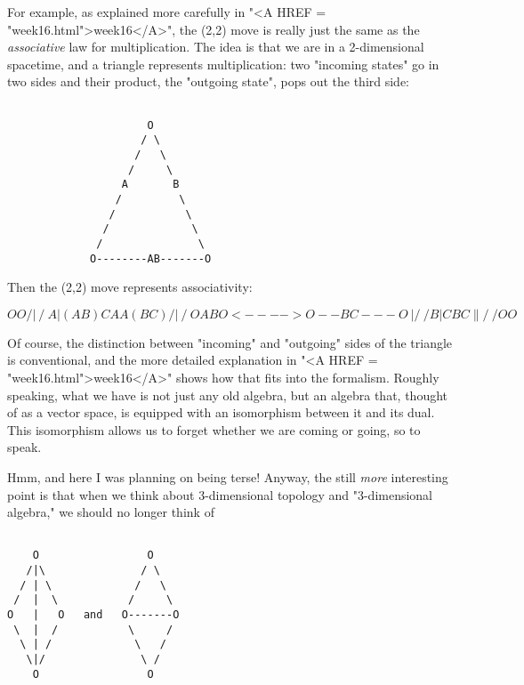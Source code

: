 For example, as explained more carefully 
in "<A HREF = "week16.html">week16</A>", the (2,2) move is
really just the same as the \emph{associative} law for multiplication.  The
idea is that we are in a 2-dimensional spacetime, and a triangle
represents multiplication: two "incoming states" go in two sides and
their product, the "outgoing state", pops out the third side:


\begin{verbatim}

                      O
                     / \
                    /   \
                   /     \
                  A       B
                 /         \
                /           \
               /             \
              /               \
             O--------AB-------O
\end{verbatim}
    

Then the (2,2) move represents associativity:



$$

    O                   O
   /|\                 / \
  A | (AB)C           A   A(BC)
 /  |  \             /     \
O   AB  O   <---->  O--BC---O
 \  |  /             \     /
  B | C               B   C
   \|/                 \ /
    O                   O
$$
    

Of course, the distinction between "incoming" and "outgoing" sides of
the triangle is conventional, and the more detailed explanation in
"<A HREF = "week16.html">week16</A>" shows how that fits into the formalism.  
Roughly speaking, what
we have is not just any old algebra, but an algebra that, thought of as
a vector space, is equipped with an isomorphism between it and its
dual.   This isomorphism allows us to forget whether we are coming or
going, so to speak.

Hmm, and here I was planning on being terse!  Anyway, the still \emph{more}
interesting point is that when we think about 3-dimensional topology and
"3-dimensional algebra," we should no longer think of 



\begin{verbatim}

    O                 O
   /|\               / \
  / | \             /   \
 /  |  \           /     \
O   |   O   and   O-------O
 \  |  /           \     /
  \ | /             \   /
   \|/               \ /
    O                 O
\end{verbatim}
    

